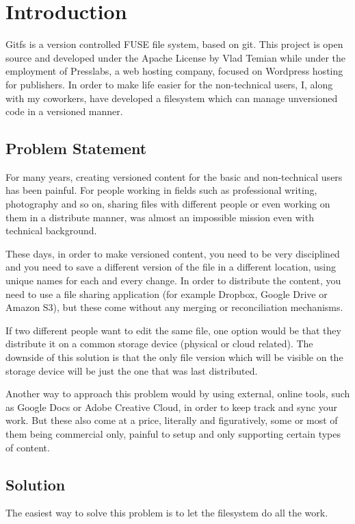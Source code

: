 
\chapter{Introduction}

Gitfs is a version controlled FUSE file system, based on git. This project is open source and developed under the Apache License by Vlad Temian while under the employment of Presslabs, a web hosting company, focused on Wordpress hosting for publishers. In order to make life easier for the non-technical users, I, along with my coworkers, have developed a filesystem which can manage unversioned code in a versioned manner.

\section{Problem Statement}

For many years, creating versioned content for the basic and non-technical users has been painful. For people working in fields such as professional writing, photography and so on, sharing files with different people or even working on them in a distribute manner, was almost an impossible mission even with technical background.

These days, in order to make versioned content, you need to be very disciplined and you need to save a different version of the file in a different location, using unique names for each and every change. In order to distribute the content, you need to use a file sharing application (for example Dropbox, Google Drive or Amazon S3), but these come without any merging or reconciliation mechanisms. 

If two different people want to edit the same file, one option would be that they distribute it on a common storage device (physical or cloud related). The downside of this solution is that the only file version which will be visible on the storage device will be just the one that was last distributed.

Another way to approach this problem would by using external, online tools, such as Google Docs or Adobe Creative Cloud, in order to keep track and sync your work. But these also come at a price, literally and figuratively, some or most of them being commercial only, painful to setup and only supporting certain types of content.

\section{Solution}
The easiest way to solve this problem is to let the filesystem do all the work.

